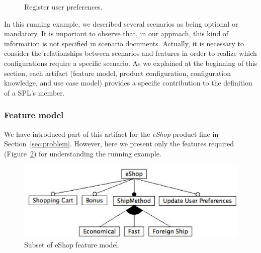 \begin{figure}[h]
\caption{Register user preferences.}
\label{fig:register-preferences-flow}
\end{figure}

In this running example, we described several scenarios as being optional or
mandatory. It is important to observe that, in our approach, this kind of
information is not specified in scenario documents. Actually, it is necessary to
consider the relationships between scenarios and features in order to realize
which configurations require a specific scenario. As we explained at the
beginning of this section, each artifact (feature model, product configuration,
configuration knowledge, and use case model) provides a specific contribution to
the definition of a SPL's member.

\subsubsection{Feature model}

We have introduced part of this artifact for the \emph{eShop} product line in
Section~\ref{sec:problem}. However, here we present only the features required
(Figure~\ref{fig:eshop-fm-re}) for understanding the running example.

 \begin{figure}[h]
 \begin{center}
  \includegraphics[scale=0.40]{img/eShop-fm-re.eps}
   \caption{Subset of eShop feature model.}
  \label{fig:eshop-fm-re}
  \end{center}
\end{figure}

